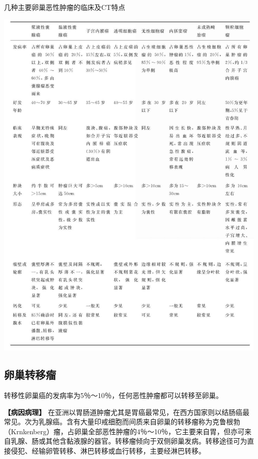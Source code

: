 \begin{table}[htbp]
\centering
\caption{几种主要卵巢恶性肿瘤的临床及CT特点}
\label{tab21-2}
\includegraphics[width=\textwidth,height=\textheight,keepaspectratio]{./images/Image00415.jpg}
\end{table}

\subsection{卵巢转移瘤}

转移性卵巢癌的发病率为5％～10％，任何恶性肿瘤都可以转移至卵巢。

\textbf{【病因病理】}
在亚洲以胃肠道肿瘤尤其是胃癌最常见，在西方国家则以结肠癌最常见。次为乳腺癌。含有大量印戒细胞而间质来自卵巢的转移瘤称为克鲁根勃（Krnkenberg）瘤，占卵巢全部恶性肿瘤的4％～10％，它主要来自胃，但亦可来自乳腺、肠或其他含黏液腺的器官。转移瘤倾向于双侧卵巢发病。转移途径可为直接侵犯、经输卵管转移、淋巴转移或血行转移，主要经淋巴转移。

